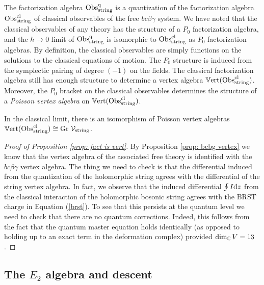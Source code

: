 The factorization algebra ${\rm Obs}^{\rm q}_{\rm string}$ is a quantization of the factorization algebra ${\rm Obs}^{{\rm cl}}_{\rm string}$ of classical observables of the free $bc\beta\gamma$ system.
We have noted that the classical observables of any theory has the structure of a $P_0$ factorization algebra, and the $\hbar \to 0$ limit of ${\rm Obs}^{\rm q}_{\rm string}$ is isomorphic to ${\rm Obs}^{{\rm cl}}_{\rm string}$ as $P_0$ factorization algebras.
By definition, the classical observables are simply functions on the solutions to the classical equations of motion.
The $P_0$ structure is induced from the symplectic pairing of degree $(-1)$ on the fields. 
The classical factorization algebra still has enough structure to determine a vertex algebra $\mathbb{V}{\rm ert}({\rm Obs}^{\rm cl}_{\rm string})$.
Moreover, the $P_0$ bracket on the classical observables determines the structure of a {\em Poisson vertex algebra} on $\mathbb{V}{\rm ert}({\rm Obs}^{{\rm cl}}_{\rm string})$. 

\begin{cor} In the classical limit, there is an isomorphism of Poisson vertex algebras~$\mathbb{V}{\rm ert}({\rm Obs}^{{\rm cl}}_{\rm string}) \cong {\rm Gr} \; \mathcal{V}_{\rm string}$.
\end{cor}

\begin{proof}[Proof of Proposition \ref{prop: fact is vert}] By Proposition \ref{prop: bcbg vertex} we know that the vertex algebra of the associated free theory is identified with the $bc\beta\gamma$ vertex algebra. 
The thing we need to check is that the differential induced from the quantization of the holomorphic string agrees with the differential of the string vertex algebra. 
In fact, we observe that the induced differential $\oint I {\rm d} z$ from the classical interaction of the holomorphic bosonic string agrees with the BRST charge in Equation (\ref{brst}). 
To see that this persists at the quantum level we need to check that there are no quantum corrections. 
Indeed, this follows from the fact that the quantum master equation holds identically (as opposed to holding up to an exact term in the deformation complex) provided $\dim_\mathbb C V = 13$. 
\end{proof}

\subsection{The $E_2$ algebra and descent}

